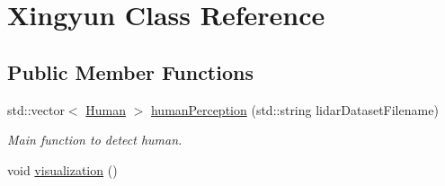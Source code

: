 \hypertarget{classXingyun}{}\section{Xingyun Class Reference}
\label{classXingyun}
\subsection*{Public Member Functions}
\begin{DoxyCompactItemize}
\item 
std\+::vector$<$ \hyperlink{classHuman}{Human} $>$ \hyperlink{classXingyun_acc758f9857fc25df9e9a6a1543753d4b}{human\+Perception} (std\+::string lidar\+Dataset\+Filename)
\begin{DoxyCompactList}\small\item\em Main function to detect human. \end{DoxyCompactList}\item 
void \hyperlink{classXingyun_ae28021d0f1ecf6b320ef0bfbf9939a6c}{visualization} ()\hypertarget{classXingyun_ae28021d0f1ecf6b320ef0bfbf9939a6c}{}\label{classXingyun_ae28021d0f1ecf6b320ef0bfbf9939a6c}


\end{DoxyCompactItemize}
